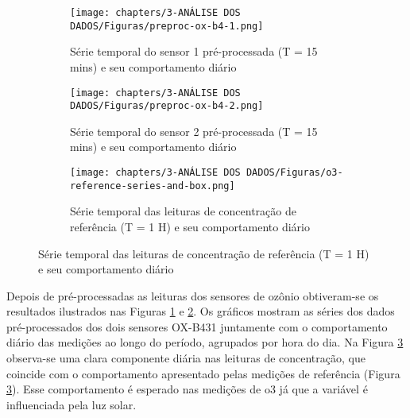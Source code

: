 \begin{figure}[h!]
    \centering
    \caption{Séries temporais dos sensores OX-B431 pré-processadas}
    \begin{subfigure}{0.9\textwidth}
        \texttt{[image: chapters/3-ANÁLISE DOS DADOS/Figuras/preproc-ox-b4-1.png]}
        \caption{Série temporal do sensor 1 pré-processada (T = 15 mins) e seu comportamento diário}
        \label{fig:data-o3-1-preproc-15}
    \end{subfigure}
    \begin{subfigure}{0.9\textwidth}
        \texttt{[image: chapters/3-ANÁLISE DOS DADOS/Figuras/preproc-ox-b4-2.png]}
        \caption{Série temporal do sensor 2 pré-processada (T = 15 mins) e seu comportamento diário}
        \label{fig:data-o3-2-preproc-15}
    \end{subfigure}
    \label{fig:data-o3-preproc-15}
    \begin{subfigure}{0.9\textwidth}
        \texttt{[image: chapters/3-ANÁLISE DOS DADOS/Figuras/o3-reference-series-and-box.png]}
        \caption{Série temporal das leituras de concentração de referência (T = 1 H) e seu comportamento diário}
        \label{fig:data-o3-reference}
    \end{subfigure}
    \label{fig:data-o3-preproc-15}
\end{figure}

Depois de pré-processadas as leituras dos sensores de ozônio obtiveram-se os resultados ilustrados nas Figuras \ref{fig:data-o3-1-preproc-15} e \ref{fig:data-o3-2-preproc-15}. Os gráficos mostram as séries dos dados pré-processados dos dois sensores OX-B431 juntamente com o comportamento diário das medições ao longo do período, agrupados por hora do dia. Na Figura \ref{fig:data-o3-reference} observa-se uma clara componente diária nas leituras de concentração, que coincide com o comportamento apresentado pelas medições de referência (Figura \ref{fig:data-o3-reference}). Esse comportamento é esperado nas medições de \acrshort{o3} já que a variável é influenciada pela luz solar.

